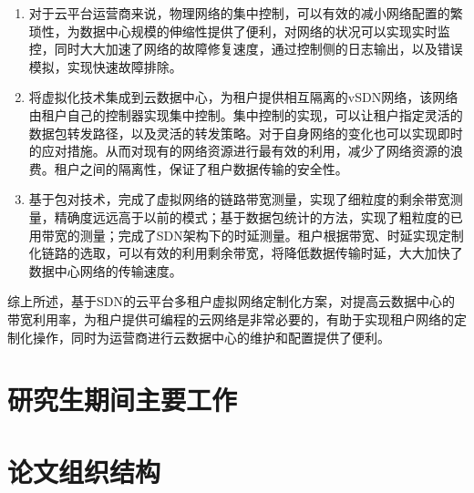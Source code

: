 \begin{enumerate}
\item 对于云平台运营商来说，物理网络的集中控制，可以有效的减小网络配置的繁琐性，为数据中心规模的伸缩性提供了便利，对网络的状况可以实现实时监控，同时大大加速了网络的故障修复速度，通过控制侧的日志输出，以及错误模拟，实现快速故障排除。
\item 将虚拟化技术集成到云数据中心，为租户提供相互隔离的\gls*{vSDN}网络，该网络由租户自己的控制器实现集中控制。集中控制的实现，可以让租户指定灵活的数据包转发路径，以及灵活的转发策略。对于自身网络的变化也可以实现即时的应对措施。从而对现有的网络资源进行最有效的利用，减少了网络资源的浪费。租户之间的隔离性，保证了租户数据传输的安全性。
\item 基于包对技术，完成了虚拟网络的链路带宽测量，实现了细粒度的剩余带宽测量，精确度远远高于以前的模式；基于数据包统计的方法，实现了粗粒度的已用带宽的测量；完成了\gls*{SDN}架构下的时延测量。租户根据带宽、时延实现定制化链路的选取，可以有效的利用剩余带宽，将降低数据传输时延，大大加快了数据中心网络的传输速度。
\end{enumerate}

综上所述，基于\gls*{SDN}的云平台多租户虚拟网络定制化方案，对提高云数据中心的带宽利用率，为租户提供可编程的云网络是非常必要的，有助于实现租户网络的定制化操作，同时为运营商进行云数据中心的维护和配置提供了便利。

\section{研究生期间主要工作}
\section{论文组织结构}


